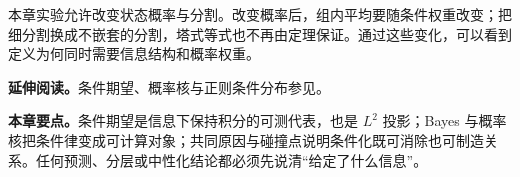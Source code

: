 本章实验允许改变状态概率与分割。改变概率后，组内平均要随条件权重改变；把细分割换成不嵌套的分割，塔式等式也不再由定理保证。通过这些变化，可以看到定义为何同时需要信息结构和概率权重。

\noindent\textbf{延伸阅读。}条件期望、概率核与正则条件分布参见\cite{kallenberg2021foundations}。




\noindent\textbf{本章要点。}条件期望是信息下保持积分的可测代表，也是 $L^2$ 投影；Bayes 与概率核把条件律变成可计算对象；共同原因与碰撞点说明条件化既可消除也可制造关系。任何预测、分层或中性化结论都必须先说清“给定了什么信息”。
